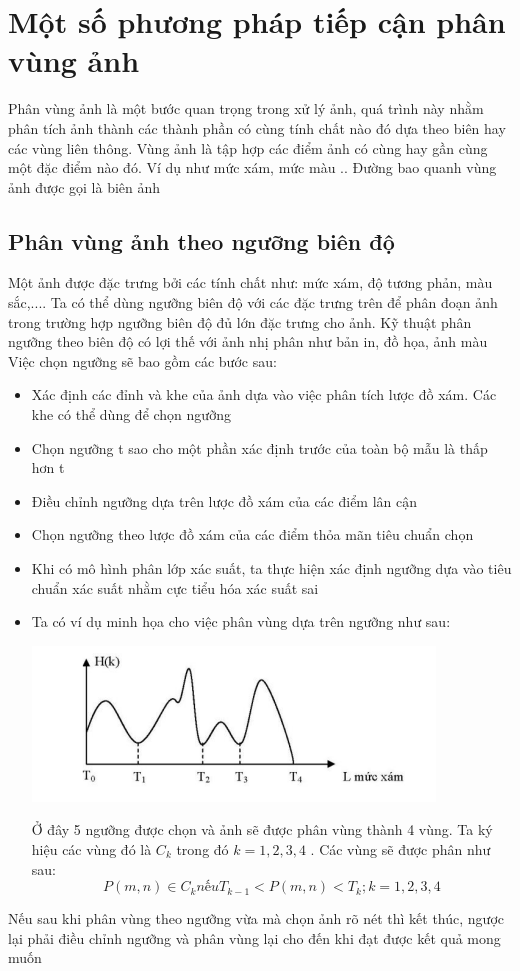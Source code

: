 \documentclass[12pt,oneside,a4]{report}
\begin{document}
\chapter{Một số phương pháp tiếp cận phân vùng ảnh}
Phân vùng ảnh là một bước quan trọng trong xử lý ảnh, quá trình này nhằm phân tích ảnh thành các thành phần có cùng tính chất nào đó dựa theo biên hay các vùng liên thông. Vùng ảnh là tập hợp các điểm ảnh có cùng hay gần cùng một đặc điểm nào đó. Ví dụ như mức xám, mức màu .. Đường bao quanh vùng ảnh được gọi là biên ảnh
\section{Phân vùng ảnh theo ngưỡng biên độ}
Một ảnh được đặc trưng bởi các tính chất như: mức xám, độ tương phản, màu sắc,.... Ta có thể dùng ngưỡng biên độ với các đặc trưng trên để phân đoạn ảnh trong trường hợp ngưỡng biên độ đủ lớn đặc trưng cho ảnh. Kỹ thuật phân ngưỡng theo biên độ có lợi thế với ảnh nhị phân như bản in, đồ họa, ảnh màu
Việc chọn ngưỡng sẽ bao gồm các bước sau:
\begin{itemize}
\item Xác định các đỉnh và khe của ảnh dựa vào việc phân tích lược đồ xám. Các khe có thể dùng để chọn ngưỡng
\item Chọn ngưỡng t sao cho một phần xác định trước của toàn bộ mẫu là thấp hơn t
\item Điều chỉnh ngưỡng dựa trên lược đồ xám của các điểm lân cận
\item Chọn ngưỡng theo lược đồ xám của các điểm thỏa mãn tiêu chuẩn chọn
\item Khi có mô hình phân lớp xác suất, ta thực hiện xác định ngưỡng dựa vào tiêu chuẩn xác suất nhằm cực tiểu hóa xác suất sai
\item Ta có ví dụ minh họa cho việc phân vùng dựa trên ngưỡng như sau:
\begin{center}
\includegraphics[]{figure/nguongbiendo.png}
\end{center}
Ở đây 5 ngưỡng được chọn và ảnh sẽ được phân vùng thành 4 vùng. Ta ký hiệu các vùng đó là $C_k$ trong đó $k=1,2,3,4$   . Các vùng sẽ được phân như sau:
\begin{equation}
P(m,n) \in C_{k} nếu T_{k-1}<P(m,n)<T_{k}; k=1,2,3,4
\end{equation} 
\end{itemize}
Nếu sau khi phân vùng theo ngưỡng vừa mà chọn ảnh rõ nét thì kết thúc, ngược lại phải điều chỉnh ngưỡng và phân vùng lại cho đến khi đạt được kết quả mong muốn
\end{document}
